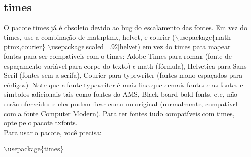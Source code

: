 \documentclass[12pt]{article}
\begin{document}
		
		\subsection{times}
			O pacote times já é obsoleto devido ao bug do escalamento das fontes. Em vez do times, use a combinação de mathptmx, helvet, e courier ($\backslash$usepackage\{{math\\ptmx,courier}\} $\backslash$usepackage[scaled=.92]{helvet}) em vez do times para mapear fontes para ser compatíveis com o times: Adobe Times para roman (fonte de espaçamento variável para corpo do texto) e  math (fórmula), Helvetica para Sans Serif (fontes sem a serifa), Courier para typewriter (fontes mono espaçados para códigos). Note que a fonte typewriter é mais fino que demais fontes e as fontes e símbolos adicionais tais como fontes do AMS, Black board bold fonts, etc, não serão oferecidos e eles podem ficar como no original (normalmente, compatível com a fonte Computer Modern).  Para ter fontes tudo compatíveis com times, opte pelo pacote txfonts.\\
			Para usar o pacote, você precisa:\\
		
			\begin{center}
				$\backslash$usepackage\{{times}\}
			\end{center}
		
		
	
\end{document}
